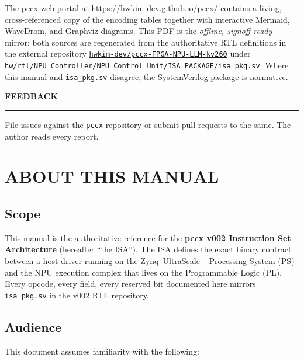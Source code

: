 \documentclass[11pt,a4paper,twoside,openany]{report}
\newcommand{\RefSection}[1]{%
  \par\medskip
  {\sffamily\bfseries\color{oceanblue}\normalsize\MakeUppercase{#1}}
  \par\vspace{-0.4em}
  {\color{oceanblue}\rule{\linewidth}{0.4pt}}\par\smallskip
}
\begin{document}
The pccx web portal at \url{https://hwkim-dev.github.io/pccx/}
contains a living, cross-referenced copy of the encoding tables
together with interactive Mermaid, WaveDrom, and Graphviz diagrams.
This PDF is the \textit{offline, signoff-ready} mirror; both sources
are regenerated from the authoritative RTL definitions in the external
repository
\href{https://github.com/hwkim-dev/pccx-FPGA-NPU-LLM-kv260}{\texttt{hwkim-dev/pccx-FPGA-NPU-LLM-kv260}}
under
\texttt{hw/rtl/NPU\_Controller/NPU\_Control\_Unit/ISA\_PACKAGE/isa\_pkg.sv}.
Where this manual and \texttt{isa\_pkg.sv} disagree, the SystemVerilog
package is normative.

\RefSection{Feedback}

File issues against the \texttt{pccx} repository or submit pull
requests to the same. The author reads every report.

\newpage

\tableofcontents
\clearpage
\listoffigures
\clearpage

\setcounter{chapter}{0}

\chapter{ABOUT THIS MANUAL}

\section{Scope}

This manual is the authoritative reference for the \textbf{pccx v002
Instruction Set Architecture} (hereafter ``the ISA''). The ISA defines
the exact binary contract between a host driver running on the
Zynq~UltraScale+ Processing System (PS) and the NPU execution complex
that lives on the Programmable Logic (PL). Every opcode, every field,
every reserved bit documented here mirrors
\texttt{isa\_pkg.sv} in the v002 RTL repository.

\section{Audience}

This document assumes familiarity with the following:
\end{document}
